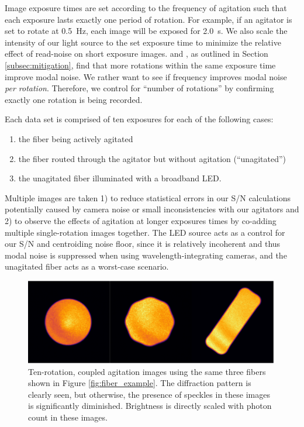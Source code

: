 \documentclass[twocolumn]{emulateapj}
\begin{document}
Image exposure times are set according to the frequency of agitation such that each exposure lasts exactly one period of rotation. For example, if an agitator is set to rotate at \SI{0.5}{\hertz}, each image will be exposed for \SI{2.0}{\second}. We also scale the intensity of our light source to the set exposure time to minimize the relative effect of read-noise on short exposure images. \citet{Baudrand2001} and \citet{Lemke2011}, as outlined in Section \ref{subsec:mitigation}, find that more rotations within the same exposure time improve modal noise. We rather want to see if frequency improves modal noise \textit{per rotation}. Therefore, we control for ``number of rotations'' by confirming exactly one rotation is being recorded.

Each data set is comprised of ten exposures for each of the following cases:
\begin{enumerate}
\item the fiber being actively agitated
\item the fiber routed through the agitator but without agitation (``unagitated'')
\item the unagitated fiber illuminated with a broadband LED.
\end{enumerate}
Multiple images are taken 1) to reduce statistical errors in our S/N calculations potentially caused by camera noise or small inconsistencies with our agitators and 2) to observe the effects of agitation at longer exposures times by co-adding multiple single-rotation images together. The LED source acts as a control for our S/N and centroiding noise floor, since it is relatively incoherent and thus modal noise is suppressed when using wavelength-integrating cameras, and the unagitated fiber acts as a worst-case scenario.

\begin{figure}
\centering
	\includegraphics[width=\columnwidth]{fiber_improved.pdf}
	\caption{Ten-rotation, coupled agitation images using the same three fibers shown in Figure \ref{fig:fiber_example}.  The diffraction pattern is clearly seen, but otherwise, the presence of speckles in these images is significantly diminished. Brightness is directly scaled with photon count in these images.}
\label{fig:fiber_improved}
\end{figure}
\end{document}
